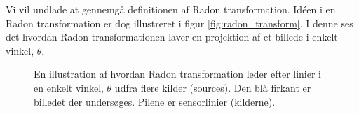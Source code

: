 



Vi vil undlade at gennemgå definitionen af Radon transformation. Idéen i en Radon transformation er dog illustreret i figur \vref{fig:radon_transform}. I denne ses det hvordan Radon transformationen laver en projektion af et billede i enkelt vinkel, $\theta$. 


\begin{figure}[htp]
  \centering
  \caption{En illustration af hvordan Radon transformation leder efter linier i en enkelt vinkel, $\theta$ udfra flere kilder (sources). Den blå firkant er billedet der undersøges. Pilene er sensorlinier (kilderne).\cite{matlab_radon}}
  \label{fig:radon_transform}
\end{figure}

